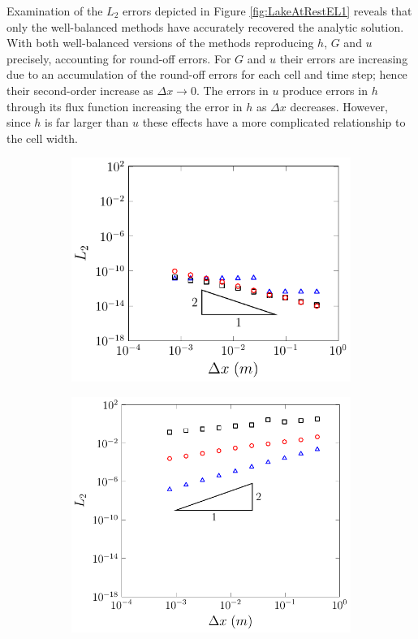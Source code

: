 Examination of the $L_2$ errors depicted in Figure \ref{fig:LakeAtRestEL1} reveals that only the well-balanced methods have accurately recovered the analytic solution. With both well-balanced versions of the methods reproducing $h$, $G$ and $u$ precisely, accounting for round-off errors. For $G$ and $u$ their errors are increasing due to an accumulation of the round-off errors for each cell and time step; hence their second-order increase as $\Delta x \rightarrow 0$. The errors in $u$ produce errors in $h$ through its flux function increasing the error in $h$ as $\Delta x$ decreases. However, since $h$ is far larger than $u$ these effects have a more complicated relationship to the cell width.

\begin{figure}
	\centering
	\begin{subfigure}{0.5\textwidth}
		\includegraphics[width=\textwidth]{./chp5/figures/Analytic/LakeAtRest/L2/FEVMWB.pdf}
		\vspace{0.3cm}
	\end{subfigure}%
	\begin{subfigure}{0.5\textwidth}
		\includegraphics[width=\textwidth]{./chp5/figures/Analytic/LakeAtRest/L2/FEVMnWB.pdf}

\end{subfigure}
\end{figure}

